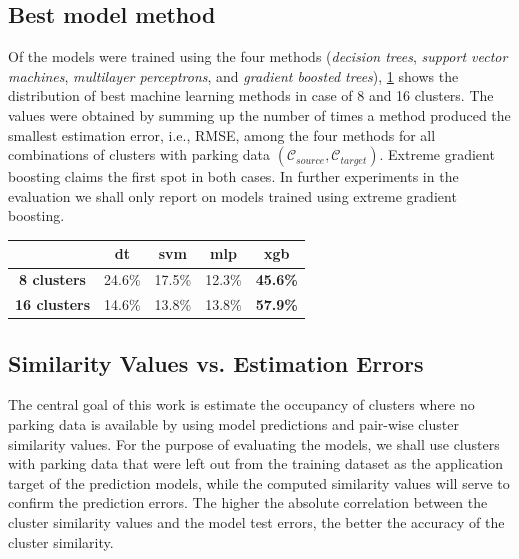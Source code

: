 	\subsection{Best model method}
	\label{sec:bestmodel}
	Of the models were trained using the four methods (\textit{decision trees}, \textit{support vector machines}, \textit{multilayer perceptrons}, and \textit{gradient boosted trees}), \cref{evaluation:best_model_method} shows the distribution of best machine learning methods in case of 8 and 16 clusters. The values were obtained by summing up the number of times a method produced the smallest estimation error, i.e., RMSE, among the four methods for all combinations of clusters with parking data $(\mathcal{C}_{source}, \mathcal{C}_{target})$.
	Extreme gradient boosting claims the first spot in both cases.
	In further experiments in the evaluation we shall only report on models trained using extreme gradient boosting.
	
	\begin{table}[!ht]
		{\begin{tabular}{ | c | c | c | c | c |}
				\hline
				& \textbf{dt} & \textbf{svm} & \textbf{mlp} & \textbf{xgb} \\ \hline
				\textbf{8 clusters} & 24.6\% & 17.5\% & 12.3\% & \textbf{45.6\%} \\ \hline
				\textbf{16 clusters} & 14.6\% & 13.8\% & 13.8\% & \textbf{57.9\%} \\ \hline
			\end{tabular}}
			\label{evaluation:best_model_method}
	\end{table}
		
	\subsection{Similarity Values vs. Estimation Errors}
	The central goal of this work is estimate the occupancy of clusters where no parking data is available by using model predictions and pair-wise cluster similarity values. For the purpose of evaluating the models, we shall use clusters with parking data that were left out from the training dataset as the application target of the prediction models, while the computed similarity values will serve to confirm the prediction errors. The higher the absolute correlation between the cluster similarity values and the model test errors, the better the accuracy of the cluster similarity. 
	
